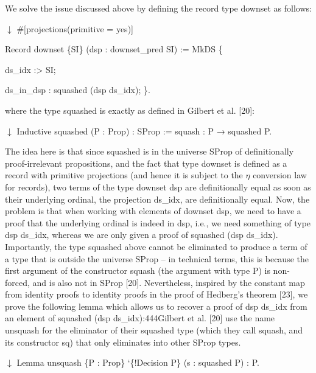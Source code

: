  
 
We solve the issue discussed above by defining the record type downset as follows:\par
  \ensuremath{\downarrow} 
 \#[projections(primitive = yes)] 
 
 Record downset \{SI\} (dsp : downset\_pred SI) := MkDS \{ 
 
  ds\_idx :> SI; 
 
  ds\_in\_dsp : squashed (dsp ds\_idx); \}. 
  
where the type squashed is exactly as defined in Gilbert et al. [20]:\par
  \ensuremath{\downarrow} 
 Inductive squashed (P : Prop) : SProp := squash : P → squashed P. 
  
The idea here is that since squashed is in the universe SProp of definitionally proof-irrelevant propositions, and the fact that type downset is defined as a record with primitive projections (and hence it is subject to the $\eta$ conversion law for records), two terms of the type downset dsp are definitionally equal as soon as their underlying ordinal, the projection ds\_idx, are definitionally equal. Now, the problem is that when working with elements of downset dsp, we need to have a proof that the underlying ordinal is indeed in dsp, i.e., we need something of type dsp ds\_idx, whereas we are only given a proof of squashed (dsp ds\_idx). Importantly, the type squashed above cannot be eliminated to produce a term of a type that is outside the universe SProp – in technical terms, this is because the first argument of the constructor squash (the argument with type P) is non-forced, and is also not in SProp [20]. Nevertheless, inspired by the constant map from identity proofs to identity proofs in the proof of Hedberg’s theorem [23], we prove the following lemma which allows us to recover a proof of dsp ds\_idx from an element of squashed (dsp ds\_idx):444Gilbert et al. [20] use the name unsquash for the eliminator of their squashed type (which they call squash, and its constructor sq) that only eliminates into other SProp types.\par
  \ensuremath{\downarrow} 
 Lemma unsquash \{P : Prop\} ‘\{!Decision P\} (s : squashed P) : P. 
  
